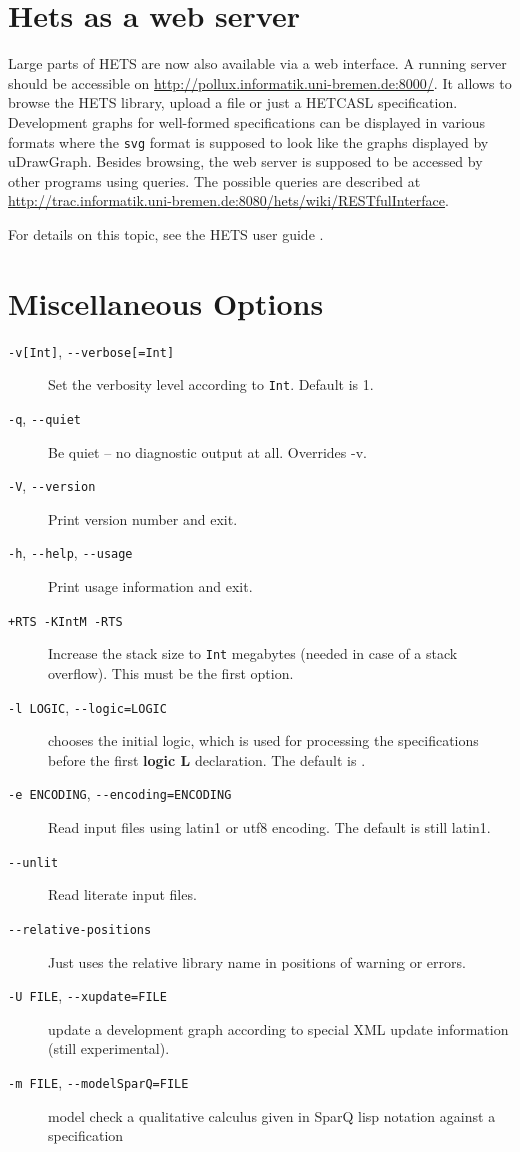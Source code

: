 \documentclass{article}
\newcommand{\normalTEXTSC}[2]{{#1\scriptsize#2}}
\newcommand     {\Hets}{\normalTEXTSC{H}{ETS}\xspace}
\newcommand{\HetCASL}{\normalTEXTSC{H}{ET}\normalTEXTSC{C}{ASL}\xspace}
\begin{document}
\section{Hets as a web server}\label{sec:Server}

Large parts of \Hets are now also available via a web interface. A running
server should be accessible on
\url{http://pollux.informatik.uni-bremen.de:8000/}. It allows to browse the
\Hets library, upload a file or just a \HetCASL specification. Development
graphs for well-formed specifications can be displayed in various formats
where the \texttt{svg} format is supposed to look like the graphs displayed by
uDrawGraph. Besides browsing, the web server is supposed to be accessed by
other programs using queries. The possible queries are described at
\url{http://trac.informatik.uni-bremen.de:8080/hets/wiki/RESTfulInterface}.

For details on this topic, see the \Hets user guide \cite{HetsUserGuide}.

\section{Miscellaneous Options}

\begin{description}
\item[\texttt{-v[Int]}, \texttt{-{}-verbose[=Int]}]
Set the verbosity level according to \texttt{Int}. Default is 1.
\item[\texttt{-q}, \texttt{-{}-quiet}]
Be quiet -- no diagnostic output at all. Overrides -v.
\item[\texttt{-V}, \texttt{-{}-version}] Print version number and exit.
\item[\texttt{-h}, \texttt{-{}-help}, \texttt{-{}-usage}]
Print usage information and exit.
\item[\texttt{+RTS -KIntM -RTS}] Increase the stack size to
 \texttt{Int} megabytes (needed in case of a stack overflow).
This must be the first option.
\item[\texttt{-l LOGIC}, \texttt{-{}-logic=LOGIC}] chooses the initial logic, which is used for processing the specifications before the first \textbf{logic L}
declaration. The default is \CASL.
\item[\texttt{-e ENCODING}, \texttt{-{}-encoding=ENCODING}] Read input files using latin1 or utf8 encoding. The default is still latin1.
\item[\texttt{-{}-unlit}] Read literate input files.
\item[\texttt{-{}-relative-positions}] Just uses the relative library name in positions of warning or errors.
\item[\texttt{-U FILE}, \texttt{-{}-xupdate=FILE}] update a development graph according to special XML update information (still experimental).
\item[\texttt{-m FILE}, \texttt{-{}-modelSparQ=FILE}] model check a qualitative calculus given in SparQ lisp notation \cite{SparQ06} against a \CASL specification
\end{description}




\end{document}

